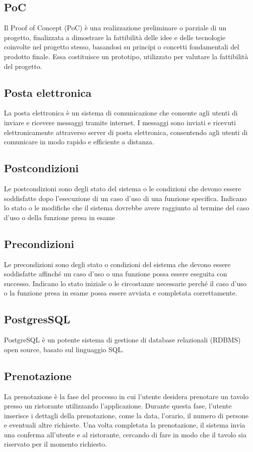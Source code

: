 \subsection{PoC} 
Il  Proof of Concept (PoC) è una realizzazione preliminare o parziale di un progetto, finalizzata a dimostrare la fattibilità delle idee e delle tecnologie coinvolte nel progetto stesso, basandosi su principi o concetti fondamentali del prodotto finale. Essa costituisce un prototipo, utilizzato per valutare la fattibilità del progetto. 
\subsection{Posta elettronica} 
La posta elettronica è un sistema di comunicazione che consente agli utenti di inviare e ricevere messaggi tramite internet. I messaggi sono inviati e ricevuti elettronicamente attraverso server di posta elettronica, consentendo agli utenti di comunicare in modo rapido e efficiente a distanza. 
\subsection{Postcondizioni} 
Le postcondizioni sono degli stato del sistema o le condizioni che devono essere soddisfatte dopo l'esecuzione di un caso d'uso di una funzione specifica. Indicano lo stato o le modifiche che il sistema dovrebbe avere raggiunto al termine del caso d'uso o della funzione presa in esame 
\subsection{Precondizioni} 
Le precondizioni sono degli stato o condizioni del sistema che devono essere soddisfatte affinché un caso d'uso o una funzione possa essere eseguita con successo. Indicano lo stato iniziale o le circostanze necessarie perché il caso d'uso o la funzione presa in esame possa essere avviata e completata correttamente. 
\subsection{PostgresSQL} 
PostgreSQL è un potente sistema di gestione di database relazionali (RDBMS) open source, basato sul linguaggio SQL.
\subsection{Prenotazione} 
La prenotazione è la fase del processo in cui l'utente desidera prenotare un tavolo presso un ristorante utilizzando l'applicazione. Durante questa fase, l'utente inserisce i dettagli della prenotazione, come la data, l'orario, il numero di persone e eventuali altre richieste. Una volta completata la prenotazione, il sistema invia una conferma all'utente e al ristorante, cercando di fare in modo che il tavolo sia riservato per il momento richiesto. 

